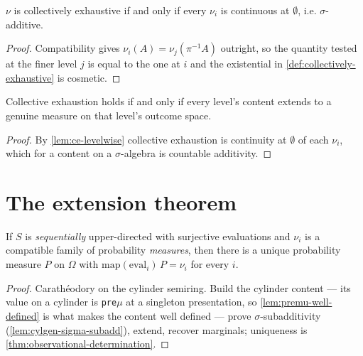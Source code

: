 \begin{lemma}
\label{lem:ce-levelwise}
\leanok
{}
$\nu$ is collectively exhaustive if and only if every $\nu_i$ is continuous at
$\emptyset$, i.e. $\sigma$-additive.
\end{lemma}

\begin{proof}
\leanok
Compatibility gives $\nu_i(A) = \nu_j(\pi^{-1}A)$ outright, so the quantity
tested at the finer level $j$ is equal to the one at $i$ and the existential in
\ref{def:collectively-exhaustive} is cosmetic.
\end{proof}

\begin{theorem}[SP1]
\label{thm:sp1-iff}
\leanok
{}
Collective exhaustion holds if and only if every level's content extends to a
genuine measure on that level's outcome space.
\end{theorem}

\begin{proof}
\leanok
By \ref{lem:ce-levelwise} collective exhaustion is continuity at $\emptyset$ of
each $\nu_i$, which for a content on a $\sigma$-algebra is countable
additivity.
\end{proof}

\section{The extension theorem}

\begin{theorem}
\label{thm:observational-extension-seq}
\leanok
{}
If $S$ is \emph{sequentially} upper-directed with surjective evaluations and
$\nu_i$ is a compatible family of probability \emph{measures}, then there is a
unique probability measure $P$ on $\Omega$ with
$\mathrm{map}(\mathrm{eval}_i)\,P = \nu_i$ for every $i$.
\end{theorem}

\begin{proof}
\leanok
{}
Carath\'eodory on the cylinder semiring. Build the cylinder content --- its
value on a cylinder is \texttt{pre}$\mu$ at a singleton presentation, so
\ref{lem:premu-well-defined} is what makes the content well defined --- prove
$\sigma$-subadditivity (\ref{lem:cylgen-sigma-subadd}), extend, recover
marginals; uniqueness is \ref{thm:observational-determination}.
\end{proof}

